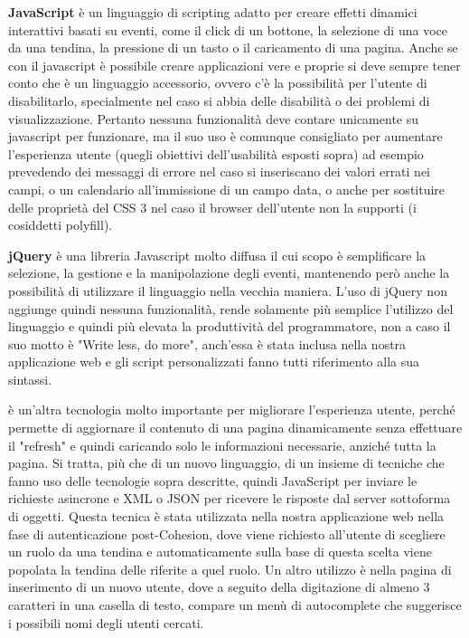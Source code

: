\textbf{JavaScript} è un linguaggio di scripting adatto per creare effetti dinamici interattivi basati su eventi, come il click di un bottone, la selezione di una voce da una tendina, la pressione di un tasto o il caricamento di una pagina.
Anche se con il javascript è possibile creare applicazioni vere e proprie si deve sempre tener conto che è un linguaggio accessorio, ovvero c'è la possibilità per l'utente di disabilitarlo, specialmente nel caso si abbia delle disabilità o dei problemi di visualizzazione.
Pertanto nessuna funzionalità deve contare unicamente su javascript per funzionare, ma il suo uso è comunque consigliato per aumentare l'esperienza utente (quegli obiettivi dell'usabilità esposti sopra) ad esempio prevedendo dei messaggi di errore nel caso si inseriscano dei valori errati nei campi, o un calendario all'immissione di un campo data, o anche per sostituire delle proprietà del CSS 3 nel caso il browser dell'utente non la supporti (i cosiddetti polyfill).

\textbf{jQuery}  è una libreria Javascript molto diffusa il cui scopo è semplificare la selezione, la gestione e la manipolazione degli eventi, mantenendo però anche la possibilità di utilizzare il linguaggio nella vecchia maniera.
L'uso di jQuery non aggiunge quindi nessuna funzionalità, rende solamente più semplice l'utilizzo del linguaggio e quindi più elevata la produttività del programmatore, non a caso il suo motto è "Write less, do more", anch'essa è stata inclusa nella nostra applicazione web e gli script personalizzati fanno tutti riferimento alla sua sintassi.

 è un'altra tecnologia molto importante per migliorare l'esperienza utente, perché permette di aggiornare il contenuto di una pagina dinamicamente senza effettuare il "refresh" e quindi caricando solo le informazioni necessarie, anziché tutta la pagina.
Si tratta, più che di un nuovo linguaggio, di un insieme di tecniche che fanno uso delle tecnologie sopra descritte, quindi JavaScript per inviare le richieste asincrone e XML o JSON per ricevere le risposte dal server sottoforma di oggetti.
Questa tecnica è stata utilizzata nella nostra applicazione web nella fase di autenticazione post-Cohesion, dove viene richiesto all'utente di scegliere un ruolo da una tendina e automaticamente sulla base di questa scelta viene popolata la tendina delle riferite a quel ruolo.
Un altro utilizzo è nella pagina di inserimento di un nuovo utente, dove a seguito della digitazione di almeno 3 caratteri in una casella di testo, compare un menù di autocomplete che suggerisce i possibili nomi degli utenti cercati.


